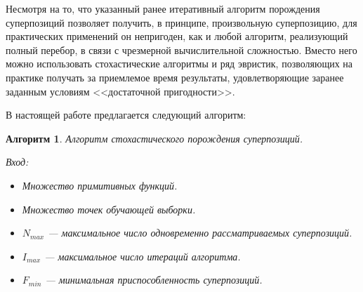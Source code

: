 \documentclass[12pt,a4paper]{amsart}
\newtheorem{algo}{Алгоритм}
\begin{document}
Несмотря на то, что указанный ранее итеративный алгоритм порождения
суперпозиций позволяет получить, в принципе, произвольную суперпозицию,
для практических применений он непригоден, как и любой алгоритм, реализующий
полный перебор, в связи с чрезмерной вычислительной сложностью. Вместо него
можно использовать стохастические алгоритмы и ряд эвристик, позволяющих на
практике получать за приемлемое время результаты, удовлетворяющие заранее
заданным условиям <<достаточной пригодности>>.

В настоящей работе предлагается следующий алгоритм:

\begin{algo}
  Алгоритм стохастического порождения суперпозиций.

  Вход:
  \begin{itemize}
	\item Множество примитивных функций.
	\item Множество точек обучающей выборки.
	\item $N_{max}$ --- максимальное число одновременно рассматриваемых
	  суперпозиций.
	\item $I_{max}$ --- максимальное число итераций алгоритма.
	\item $F_{min}$ --- минимальная приспособленность суперпозиций.
  \end{itemize}


\end{algo}
\end{document}
